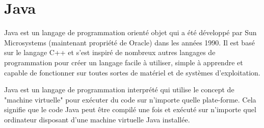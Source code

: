 \section{Java}\label{sec:java}
Java est un langage de programmation orienté objet qui a été développé par Sun Microsystems (maintenant propriété de Oracle) dans les années 1990. Il est basé sur le langage C++ et s'est inspiré de nombreux autres langages de programmation pour créer un langage facile à utiliser, simple à apprendre et capable de fonctionner sur toutes sortes de matériel et de systèmes d'exploitation.

Java est un langage de programmation interprété qui utilise le concept de "machine virtuelle" pour exécuter du code sur n'importe quelle plate-forme. Cela signifie que le code Java peut être compilé une fois et exécuté sur n'importe quel ordinateur disposant d'une machine virtuelle Java installée.

